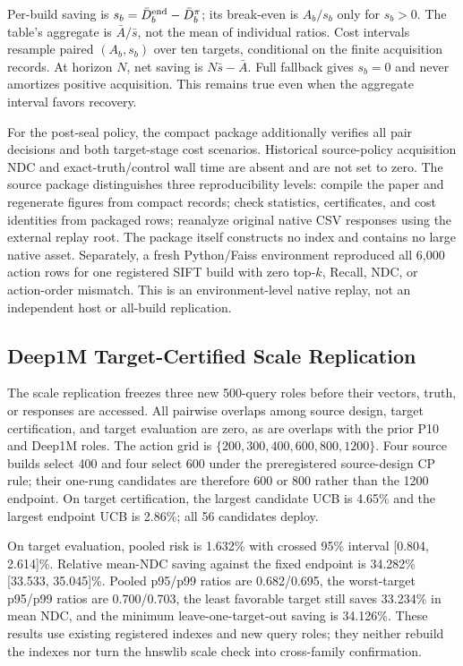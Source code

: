 \documentclass[sigconf,anonymous]{acmart}
\begin{document}
Per-build saving is $s_b=\bar D_b^{\rm end}-\bar D_b^{\pi}$; its break-even is $A_b/s_b$ only for $s_b>0$. The table's aggregate is $\bar A/\bar s$, not the mean of individual ratios. Cost intervals resample paired $(A_b,s_b)$ over ten targets, conditional on the finite acquisition records. At horizon $N$, net saving is $N\bar s-\bar A$. Full fallback gives $s_b=0$ and never amortizes positive acquisition. This remains true even when the aggregate interval favors recovery.

For the post-seal policy, the compact package additionally verifies all pair decisions and both target-stage cost scenarios. Historical source-policy acquisition NDC and exact-truth/control wall time are absent and are not set to zero. The source package distinguishes three reproducibility levels: compile the paper and regenerate figures from compact records; check statistics, certificates, and cost identities from packaged rows; reanalyze original native CSV responses using the external replay root. The package itself constructs no index and contains no large native asset. Separately, a fresh Python/Faiss environment reproduced all 6,000 action rows for one registered SIFT build with zero top-$k$, Recall, NDC, or action-order mismatch. This is an environment-level native replay, not an independent host or all-build replication.

\subsection{Deep1M Target-Certified Scale Replication}
The scale replication freezes three new 500-query roles before their vectors, truth, or responses are accessed. All pairwise overlaps among source design, target certification, and target evaluation are zero, as are overlaps with the prior P10 and Deep1M roles. The action grid is $\{200,300,400,600,800,1200\}$. Four source builds select 400 and four select 600 under the preregistered source-design CP rule; their one-rung candidates are therefore 600 or 800 rather than the 1200 endpoint. On target certification, the largest candidate UCB is 4.65\% and the largest endpoint UCB is 2.86\%; all 56 candidates deploy.

On target evaluation, pooled risk is 1.632\% with crossed 95\% interval [0.804, 2.614]\%. Relative mean-NDC saving against the fixed endpoint is 34.282\% [33.533, 35.045]\%. Pooled p95/p99 ratios are 0.682/0.695, the worst-target p95/p99 ratios are 0.700/0.703, the least favorable target still saves 33.234\% in mean NDC, and the minimum leave-one-target-out saving is 34.126\%. These results use existing registered indexes and new query roles; they neither rebuild the indexes nor turn the hnswlib scale check into cross-family confirmation.
\end{document}
